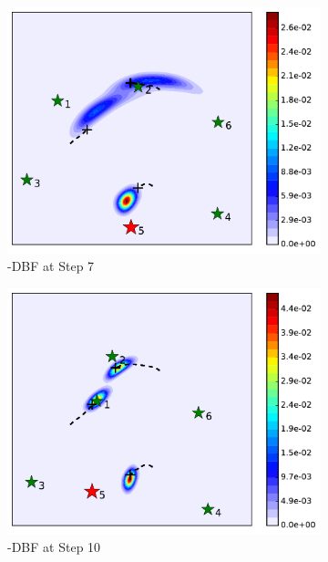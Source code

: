 \begin{figure}
\begin{subfigure}[b]{0.23\textwidth}
			\includegraphics[width=\textwidth]{figures/dbf_hetero_mov_sen_mov_tar_rbt5_step7}
			\caption{\proto-DBF at Step 7}\label{fig:step7}
		\end{subfigure}
		\begin{subfigure}[b]{0.23\textwidth}
			\includegraphics[width=\textwidth]{figures/dbf_hetero_mov_sen_mov_tar_rbt5_step10}
			\caption{\proto-DBF at Step 10}\label{fig:step10}
		\end{subfigure}
		\begin{subfigure}[b]{0.23\textwidth}

\end{subfigure}
\end{figure}
